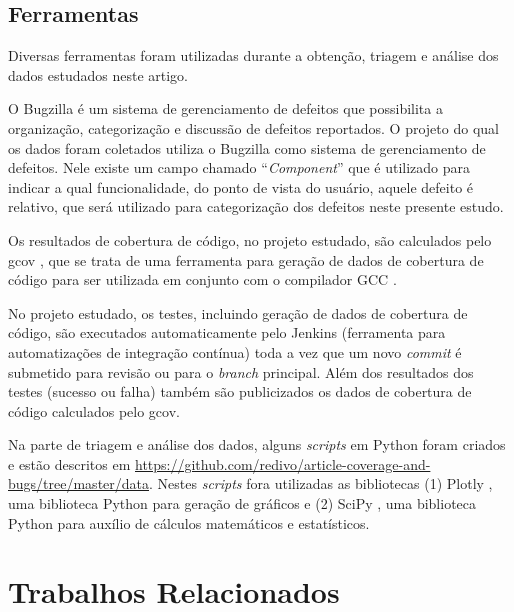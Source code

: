 \documentclass[11.5pt]{article}
\begin{document}
\subsection{Ferramentas}

Diversas ferramentas foram utilizadas durante a obtenção, triagem e análise dos dados estudados
neste artigo.

O Bugzilla \cite{bugzilla} é um sistema de gerenciamento de defeitos que possibilita a organização,
categorização e discussão de defeitos reportados.
O projeto do qual os dados foram coletados utiliza o Bugzilla como sistema de gerenciamento de
defeitos. Nele existe um campo chamado ``\textit{Component}'' que é utilizado para indicar a qual
funcionalidade, do ponto de vista do usuário, aquele defeito é relativo, que será utilizado para
categorização dos defeitos neste presente estudo.

Os resultados de cobertura de código, no projeto estudado, são calculados pelo gcov \cite{gcov}, que
se trata de uma ferramenta para geração de dados de cobertura de código para ser utilizada em conjunto
com o compilador GCC \cite{gcc}.

No projeto estudado, os testes, incluindo geração de dados de cobertura de código, são executados
automaticamente pelo Jenkins \cite{jenkins} (ferramenta para automatizações de integração contínua)
toda a vez que um novo \textit{commit} é submetido para revisão ou para o \textit{branch} principal.
Além dos resultados dos testes (sucesso ou falha) também são publicizados os dados de cobertura de
código calculados pelo gcov.

Na parte de triagem e análise dos dados, alguns \textit{scripts} em Python foram criados e estão
descritos em \url{https://github.com/redivo/article-coverage-and-bugs/tree/master/data}.
Nestes \textit{scripts} fora utilizadas as bibliotecas
(1) Plotly \cite{plotly}, uma biblioteca Python para geração de gráficos e (2) SciPy \cite{scipy},
uma biblioteca Python para auxílio de cálculos matemáticos e estatísticos.



\section{Trabalhos Relacionados}
\end{document}
